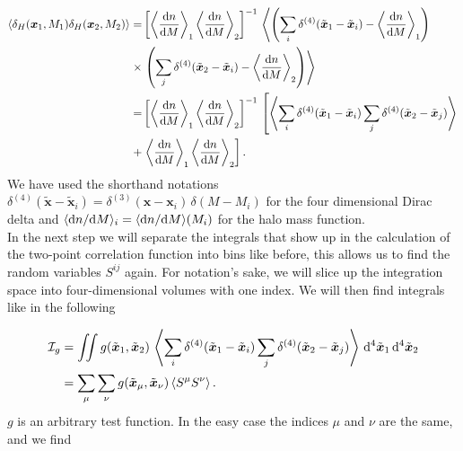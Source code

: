 \documentclass[../main.tex]{subfiles}
\begin{document}
\begin{align}
    \label{eq:two-point-halo-seed-denstiy-correlation}
    \langle \delta_H(\boldsymbol{x}_1,M_1) \delta_H(\boldsymbol{x}_2,M_2) \rangle =& \left[\left\langle  \frac{\mathrm{d} n}{\mathrm{d} M} \right\rangle_1\left\langle  \frac{\mathrm{d} n}{\mathrm{d} M} \right\rangle_2\right]^{-1}\,\left\langle\left(\sum_i \delta^{(4)}(\tilde{\boldsymbol{x}}_1-\tilde{\boldsymbol{x}}_i) - \left\langle  \frac{\mathrm{d} n}{\mathrm{d} M} \right\rangle_1\right) \right. \\
\times& \left.\left(\sum_j \delta^{(4)}(\tilde{\boldsymbol{x}}_2-\tilde{\boldsymbol{x}}_i) - \left\langle  \frac{\mathrm{d} n}{\mathrm{d} M} \right\rangle_2\right) \right\rangle \nonumber\\
=& \left[\left\langle  \frac{\mathrm{d} n}{\mathrm{d} M} \right\rangle_1\left\langle  \frac{\mathrm{d} n}{\mathrm{d} M} \right\rangle_2\right]^{-1}\,\left[\left\langle\sum_i \delta^{(4)}(\tilde{\boldsymbol{x}}_1-\tilde{\boldsymbol{x}}_i)\sum_j \delta^{(4)}(\tilde{\boldsymbol{x}}_2-\tilde{\boldsymbol{x}}_j)\right\rangle \right. \\
+&\left. \left\langle  \frac{\mathrm{d} n}{\mathrm{d} M} \right\rangle_1\left\langle  \frac{\mathrm{d} n}{\mathrm{d} M} \right\rangle_2\right]. \nonumber
\end{align}
We have used the shorthand notations $\delta^{(4)}(\tilde{\boldsymbol{x}}-\tilde{\boldsymbol{x}}_i) = \delta^{(3)}({\boldsymbol{x}}-{\boldsymbol{x}}_i)\,\delta(M-M_i)$ for the four dimensional Dirac delta and $\langle {\mathrm{d}n}/{\mathrm{d} M} \rangle_i = \langle  {\mathrm{d}n}/{\mathrm{d} M}\rangle(M_i)$ for the halo mass function.\\
In the next step we will separate the integrals that show up in the calculation of the two-point correlation function into bins like before, this allows us to find the random variables $S^{ij}$ again. For notation's sake, we will slice up the integration space into four-dimensional volumes with one index. We will then find integrals like in the following

\begin{align}
    \mathcal{I}_g &= \iint g(\tilde{\boldsymbol{x}}_1,\tilde{\boldsymbol{x}}_2)\,\left\langle\sum_i \delta^{(4)}(\tilde{\boldsymbol{x}}_1-\tilde{\boldsymbol{x}}_i)\sum_j \delta^{(4)}(\tilde{\boldsymbol{x}}_2-\tilde{\boldsymbol{x}}_j)\right\rangle\, \mathrm{d}^4\tilde{\boldsymbol{x}}_1 \, \mathrm{d}^4\tilde{\boldsymbol{x}}_2 \label{eq:start_derivation_dirac}\\
                &= \sum_\mu \sum_\nu g(\tilde{\boldsymbol{x}}_\mu,\tilde{\boldsymbol{x}}_\nu) \left\langle S^\mu S^\nu \right\rangle.
\end{align} 
$g$ is an arbitrary test function. In the easy case the indices $\mu$ and $\nu$ are the same, and we find 
\end{document}
